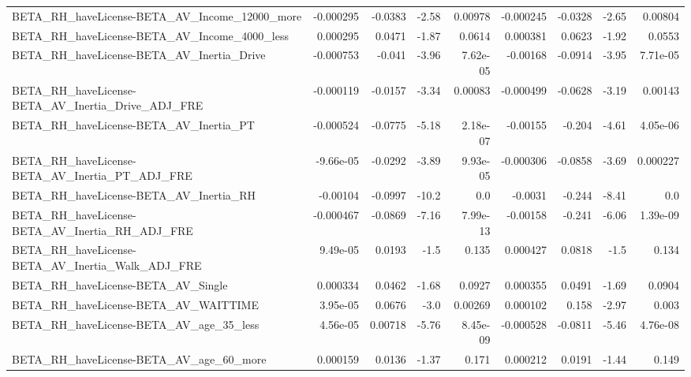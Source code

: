 \begin{tabular}{lrrrrrrrr}
BETA\_RH\_haveLicense-BETA\_AV\_Income\_12000\_more      &   -0.000295 &      -0.0383 &    -2.58 &  0.00978 &  -0.000245 &     -0.0328 &        -2.65 &       0.00804 \\
BETA\_RH\_haveLicense-BETA\_AV\_Income\_4000\_less       &    0.000295 &       0.0471 &    -1.87 &   0.0614 &   0.000381 &      0.0623 &        -1.92 &        0.0553 \\
BETA\_RH\_haveLicense-BETA\_AV\_Inertia\_Drive          &   -0.000753 &       -0.041 &    -3.96 & 7.62e-05 &   -0.00168 &     -0.0914 &        -3.95 &      7.71e-05 \\
BETA\_RH\_haveLicense-BETA\_AV\_Inertia\_Drive\_ADJ\_FRE  &   -0.000119 &      -0.0157 &    -3.34 &  0.00083 &  -0.000499 &     -0.0628 &        -3.19 &       0.00143 \\
BETA\_RH\_haveLicense-BETA\_AV\_Inertia\_PT             &   -0.000524 &      -0.0775 &    -5.18 & 2.18e-07 &   -0.00155 &      -0.204 &        -4.61 &      4.05e-06 \\
BETA\_RH\_haveLicense-BETA\_AV\_Inertia\_PT\_ADJ\_FRE     &   -9.66e-05 &      -0.0292 &    -3.89 & 9.93e-05 &  -0.000306 &     -0.0858 &        -3.69 &      0.000227 \\
BETA\_RH\_haveLicense-BETA\_AV\_Inertia\_RH             &    -0.00104 &      -0.0997 &    -10.2 &      0.0 &    -0.0031 &      -0.244 &        -8.41 &           0.0 \\
BETA\_RH\_haveLicense-BETA\_AV\_Inertia\_RH\_ADJ\_FRE     &   -0.000467 &      -0.0869 &    -7.16 & 7.99e-13 &   -0.00158 &      -0.241 &        -6.06 &      1.39e-09 \\
BETA\_RH\_haveLicense-BETA\_AV\_Inertia\_Walk\_ADJ\_FRE   &    9.49e-05 &       0.0193 &     -1.5 &    0.135 &   0.000427 &      0.0818 &         -1.5 &         0.134 \\
BETA\_RH\_haveLicense-BETA\_AV\_Single                 &    0.000334 &       0.0462 &    -1.68 &   0.0927 &   0.000355 &      0.0491 &        -1.69 &        0.0904 \\
BETA\_RH\_haveLicense-BETA\_AV\_WAITTIME               &    3.95e-05 &       0.0676 &     -3.0 &  0.00269 &   0.000102 &       0.158 &        -2.97 &         0.003 \\
BETA\_RH\_haveLicense-BETA\_AV\_age\_35\_less            &    4.56e-05 &      0.00718 &    -5.76 & 8.45e-09 &  -0.000528 &     -0.0811 &        -5.46 &      4.76e-08 \\
BETA\_RH\_haveLicense-BETA\_AV\_age\_60\_more            &    0.000159 &       0.0136 &    -1.37 &    0.171 &   0.000212 &      0.0191 &        -1.44 &         0.149 \\

\end{tabular}
